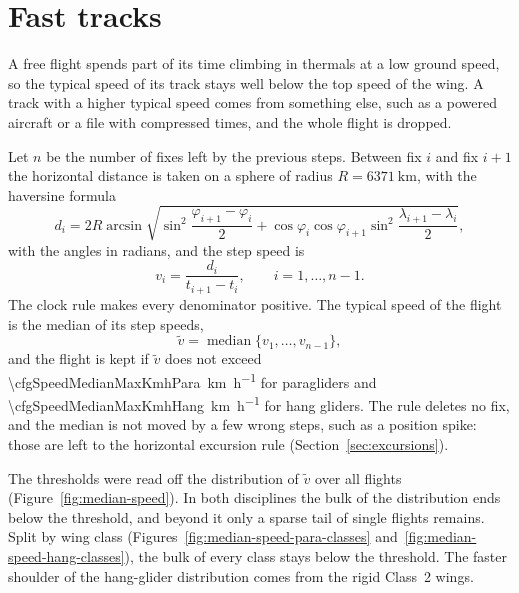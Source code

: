 \section{Fast tracks}
\label{sec:fasttracks}

A free flight spends part of its time climbing in thermals at a low ground speed, so
the typical speed of its track stays well below the top speed of the wing. A track
with a higher typical speed comes from something else, such as a powered aircraft or a
file with compressed times, and the whole flight is dropped.

Let $n$ be the number of fixes left by the previous steps. Between fix $i$ and
fix $i+1$ the horizontal distance is taken on a sphere of radius
$R=\SI{6371}{\kilo\metre}$, with the haversine formula
\begin{equation}
  d_i=2R\arcsin\sqrt{\sin^2\frac{\varphi_{i+1}-\varphi_i}{2}
  +\cos\varphi_i\cos\varphi_{i+1}\sin^2\frac{\lambda_{i+1}-\lambda_i}{2}},
  \label{eq:haversine}
\end{equation}
with the angles in radians, and the step speed is
\begin{equation}
  v_i=\frac{d_i}{t_{i+1}-t_i},\qquad i=1,\dots,n-1.
  \label{eq:step-speed}
\end{equation}
The clock rule makes every denominator positive. The typical speed of the flight is the median of its step speeds,
\begin{equation}
  \tilde v=\operatorname{median}\{v_1,\dots,v_{n-1}\},
  \label{eq:median-speed}
\end{equation}
and the flight is kept if $\tilde v$ does not exceed
\SI[per-mode=symbol]{\cfgSpeedMedianMaxKmhPara}{\kilo\metre\per\hour} for
paragliders and
\SI[per-mode=symbol]{\cfgSpeedMedianMaxKmhHang}{\kilo\metre\per\hour} for hang
gliders. The rule deletes
no fix, and the median is not moved by a few wrong steps, such as a position spike:
those are left to the horizontal excursion rule (Section~\ref{sec:excursions}).

The thresholds were read off the distribution of $\tilde v$ over all flights
(Figure~\ref{fig:median-speed}). In both disciplines the bulk of the distribution ends
below the threshold, and beyond it only a sparse tail of single flights remains.
Split by wing class (Figures~\ref{fig:median-speed-para-classes}
and~\ref{fig:median-speed-hang-classes}), the bulk of every class stays below the
threshold. The faster shoulder of the hang-glider distribution comes from the rigid
Class~2 wings.

